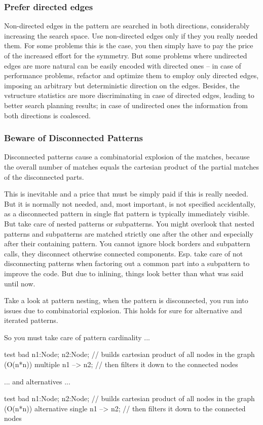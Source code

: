 \subsubsection*{Prefer directed edges}
Non-directed edges in the pattern are searched in both directions, considerably increasing the search space.
Use non-directed edges only if they you really needed them.
For some problems this is the case, you then simply have to pay the price of the increased effort for the symmetry.
But some problems where undirected edges are more natural can be easily encoded with directed ones -- in case of performance problems, refactor and optimize them to employ only directed edges, imposing an arbitrary but deterministic direction on the edges.
Besides, the vstructure statistics are more discriminating in case of directed edges, leading to better search planning results; in case of undirected ones the information from both directions is coalesced.


\subsubsection*{Beware of Disconnected Patterns}
Disconnected patterns cause a combinatorial explosion of the matches, because the overall number of matches equals the cartesian product of the partial matches of the disconnected parts. 

This is inevitable and a price that must be simply paid if this is really needed.
But it is normally not needed, and, most important, is not specified accidentally, as a disconnected pattern in single flat pattern is typically immediately visible.
But take care of nested patterns or subpatterns.
You might overlook that nested patterns and subpatterns are matched strictly one after the other and especially after their containing pattern.
You cannot ignore block borders and subpattern calls, they disconnect otherwise connected components.
Esp. take care of not disconnecting patterns when factoring out a common part into a subpattern to improve the code.
But due to inlining, things look better than what was said until now.

\begin{example}
Take a look at pattern nesting, when the pattern is disconnected, you run into issues due to combinatorial explosion.
This holds for sure for alternative and iterated patterns.

So you must take care of pattern cardinality ...
\begin{grgen}
test bad {
	n1:Node; n2:Node; // builds cartesian product of all nodes in the graph (O(n*n))
  multiple {
		n1 --> n2; // then filters it down to the connected nodes
  }
}
\end{grgen}
... and alternatives ...
\begin{grgen}
test bad {
	n1:Node; n2:Node; // builds cartesian product of all nodes in the graph (O(n*n))
  alternative {
		single {
			n1 --> n2; // then filters it down to the connected nodes
		}
  }
}
\end{grgen}
\end{example}

